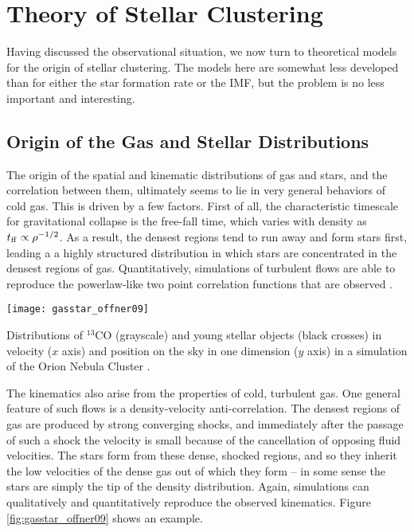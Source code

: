 \section{Theory of Stellar Clustering}

Having discussed the observational situation, we now turn to theoretical models for the origin of stellar clustering. The models here are somewhat less developed than for either the star formation rate or the IMF, but the problem is no less important and interesting.

\subsection{Origin of the Gas and Stellar Distributions}

The origin of the spatial and kinematic distributions of gas and stars, and the correlation between them, ultimately seems to lie in very general behaviors of cold gas. This is driven by a few factors. First of all, the characteristic timescale for gravitational collapse is the free-fall time, which varies with density as $t_{\rm ff} \propto \rho^{-1/2}$. As a result, the densest regions tend to run away and form stars first, leading a a highly structured distribution in which stars are concentrated in the densest regions of gas. Quantitatively, simulations of turbulent flows are able to reproduce the powerlaw-like two point correlation functions that are observed \citep{hansen12a}.

\begin{marginfigure}
\texttt{[image: gasstar\_offner09]}
\caption[Spatial and velocity distributions of gas and stars in a simulation]{
\label{fig:gasstar_offner09}
Distributions of $^{13}$CO (grayscale) and young stellar objects (black crosses) in velocity ($x$ axis) and position on the sky in one dimension ($y$ axis) in a simulation of the Orion Nebula Cluster \citep{offner09b}.
}
\end{marginfigure}

The kinematics also arise from the properties of cold, turbulent gas. One general feature of such flows is a density-velocity anti-correlation. The densest regions of gas are produced by strong converging shocks, and immediately after the passage of such a shock the velocity is small because of the cancellation of opposing fluid velocities. The stars form from these dense, shocked regions, and so they inherit the low velocities of the dense gas out of which they form -- in some sense the stars are simply the tip of the density distribution. Again, simulations can qualitatively and quantitatively reproduce the observed kinematics. Figure \ref{fig:gasstar_offner09} shows an example.

